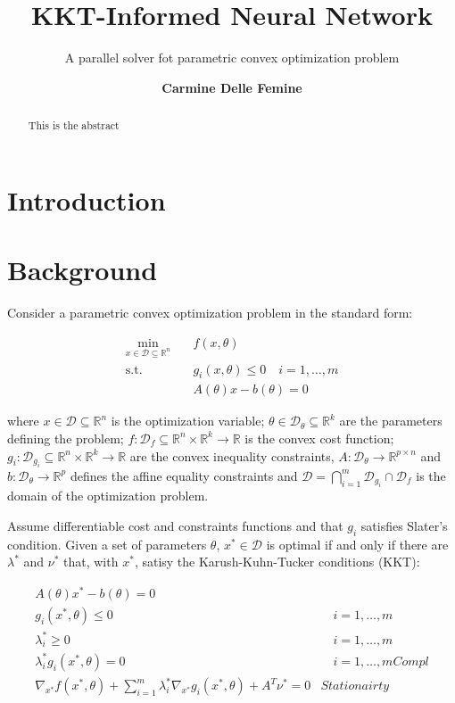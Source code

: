 \documentclass[
]{article}
\title{KKT-Informed Neural Network}
\subtitle{A parallel solver fot parametric convex optimization problem}
\author{\textbf{Carmine Delle Femine}\\}
\date{}
\begin{document}
\maketitle
\begin{abstract}
This is the abstract
\end{abstract}

\section{Introduction}\label{introduction}

\section{Background}\label{background}

Consider a parametric convex optimization problem in the standard form:

\[
\begin{aligned}
\min_{x \in \mathcal{D} \subseteq\mathbb{R}^n} \quad &f(x, {\theta})\\
\textrm{s.t.} \quad & g_i(x, \theta) \leq 0 \quad i = 1, \dots, m \\
& A(\theta) x - b(\theta) = 0
\end{aligned}
\]

where \(x \in \mathcal{D} \subseteq\mathbb{R}^n\) is the optimization
variable; \(\theta \in \mathcal{D}_\theta \subseteq \mathbb{R}^k\) are
the parameters defining the problem;
\(f: \mathcal{D}_f \subseteq\mathbb{R}^n \times \mathbb{R}^k \to \mathbb{R}\)
is the convex cost function;
\(g_i: \mathcal{D}_{g_i} \subseteq\mathbb{R}^n \times \mathbb{R}^k \to \mathbb{R}\)
are the convex inequality constraints,
\(A: \mathcal{D}_\theta \to \mathbb{R}^{p \times n}\) and
\(b: \mathcal{D}_\theta \to \mathbb{R}^{p}\) defines the affine equality
constraints and
\(\mathcal{D} = \bigcap_{i=1}^{m} \mathcal{D}_{g_i} \cap \mathcal{D}_{f}\)
is the domain of the optimization problem.

Assume differentiable cost and constraints functions and that \(g_i\)
satisfies Slater's condition. Given a set of parameters \(\theta\),
\(x^* \in \mathcal{D}\) is optimal if and only if there are
\(\lambda^*\) and \(\nu^*\) that, with \(x^*\), satisy the
Karush-Kuhn-Tucker conditions (KKT):

\begin{align}
    A(\theta) x^* - b(\theta) = 0&\\
    g_i(x^*, \theta) \leq 0& \quad i=1,\dots, m\\
    \lambda_i^* \geq 0& \quad i=1,\dots, m\\
    \lambda_i^* g_i(x^*, \theta) = 0& \quad i=1,\dots, m{Compl}\\
    \nabla_{x^*} f(x^*, \theta) + \sum\nolimits_{i=1}^m \lambda^*_i\nabla_{x^*} g_i(x^*, \theta) + A^T\nu^* = 0 &{Stationairty}
\end{align}
\end{document}
